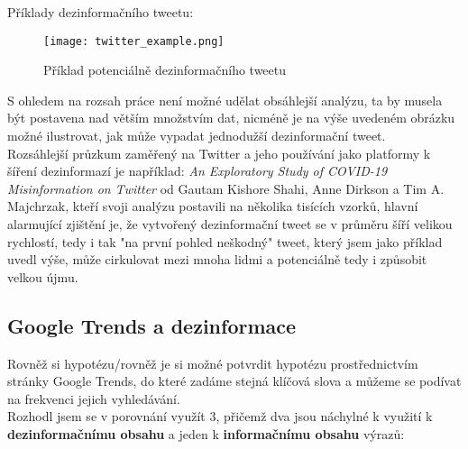 Příklady dezinformačního tweetu:\\

\begin{figure}[htbp]
  \centering
  \texttt{[image: twitter\_example.png]}
  \caption{Příklad potenciálně dezinformačního tweetu}
  \label{fig:twitter example}
\end{figure}

S ohledem na rozsah práce není možné udělat obsáhlejší analýzu, ta by musela být postavena nad větším množstvím dat, nicméně je na výše uvedeném obrázku možné ilustrovat, jak může vypadat jednodužší dezinformační tweet.\\


Rozsáhlejší průzkum zaměřený na Twitter a jeho používání jako platformy k šíření dezinformazí je například: \textit{An Exploratory Study of COVID-19 Misinformation on Twitter} od Gautam Kishore Shahi, Anne Dirkson a Tim A. Majchrzak, kteří svoji analýzu postavili na několika tisících vzorků\cite{shahi_exploratory_2020}, hlavní alarmující zjištění je, že vytvořený dezinformační tweet se v průměru šíří velikou rychlostí, tedy i tak "na první pohled neškodný" tweet, který jsem jako příklad uvedl výše, může cirkulovat mezi mnoha lidmi a potenciálně tedy i způsobit velkou újmu.\\



\subsection{Google Trends a dezinformace}

Rovněž si hypotézu/rovněž je si možné potvrdit hypotézu prostřednictvím stránky Google Trends, do které zadáme stejná klíčová slova a můžeme se podívat na frekvenci jejich vyhledávání.\\

Rozhodl jsem se v porovnání využít 3, přičemž dva jsou náchylné k využití k \textbf{dezinformačnímu obsahu} a jeden k \textbf{informačnímu obsahu} výrazů:\\

